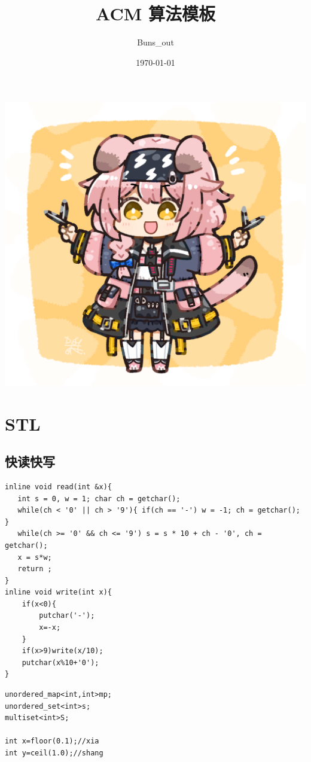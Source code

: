 \documentclass[12pt, a4paper, oneside]{ctexart}
\title{\fontsize{70}{30}\selectfont  ACM 算法模板}
\author{Buns\_out}
\date{\today}
\begin{document}
 




\maketitle
\thispagestyle{empty}
\centering
\includegraphics[scale=1.0]{pic.png}



\newpage
\tableofcontents 
\thispagestyle{empty}
\lstset{language=C++}


\newpage 
\section{STL} 
\subsection{快读快写}
\begin{lstlisting}
inline void read(int &x){
   int s = 0, w = 1; char ch = getchar();
   while(ch < '0' || ch > '9'){ if(ch == '-') w = -1; ch = getchar(); }
   while(ch >= '0' && ch <= '9') s = s * 10 + ch - '0', ch = getchar();
   x = s*w;
   return ;
}
inline void write(int x){
    if(x<0){
    	putchar('-');
		x=-x;
	}
    if(x>9)write(x/10);
    putchar(x%10+'0');
} 
\end{lstlisting}
\begin{lstlisting}
unordered_map<int,int>mp;
unordered_set<int>s;
multiset<int>S;

int x=floor(0.1);//xia
int y=ceil(1.0);//shang
\end{lstlisting}
\end{document}
